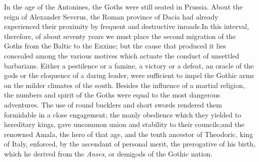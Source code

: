 In the age of the Antonines, the Goths were still seated in
Prussia. About the reign of Alexander Severus, the Roman province
of Dacia had already experienced their proximity by frequent and
destructive inroads.\footnotemark[19] In this interval, therefore, of about
seventy years we must place the second migration of the Goths
from the Baltic to the Euxine; but the cause that produced it
lies concealed among the various motives which actuate the
conduct of unsettled barbarians. Either a pestilence or a famine,
a victory or a defeat, an oracle of the gods or the eloquence of
a daring leader, were sufficient to impel the Gothic arms on the
milder climates of the south. Besides the influence of a martial
religion, the numbers and spirit of the Goths were equal to the
most dangerous adventures. The use of round bucklers and short
swords rendered them formidable in a close engagement; the manly
obedience which they yielded to hereditary kings, gave uncommon
union and stability to their councils;\footnotemark[20] and the renowned Amala,
the hero of that age, and the tenth ancestor of Theodoric, king
of Italy, enforced, by the ascendant of personal merit, the
prerogative of his birth, which he derived from the \textit{Anses}, or
demigods of the Gothic nation.\footnotemark[21]




